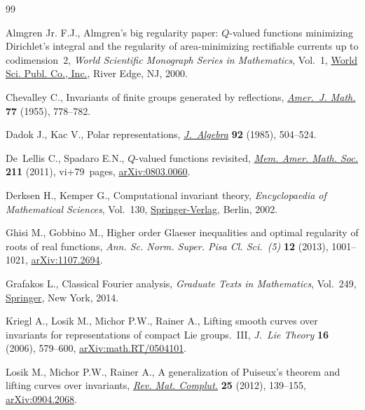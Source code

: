 \documentclass[pdftex]{sigma}
\numberwithin{equation}{section}
\begin{document}
\begin{thebibliography}{99}
\footnotesize\itemsep=0pt

Almgren Jr. F.J., Almgren's big regularity paper: $Q$-valued functions
 minimizing Dirichlet's integral and the regularity of area-minimizing
 rectifiable currents up to codimension~2, \textit{World Scientific Monograph
 Series in Mathematics}, Vol.~1, \href{https://doi.org/10.1142/4253}{World Sci. Publ. Co., Inc.}, River Edge, NJ,
 2000.

Chevalley C., Invariants of finite groups generated by reflections,
 \href{https://doi.org/10.2307/2372597}{\textit{Amer.~J. Math.}} \textbf{77} (1955), 778--782.

Dadok J., Kac V., Polar representations, \href{https://doi.org/10.1016/0021-8693(85)90136-X}{\textit{J.~Algebra}} \textbf{92}
 (1985), 504--524.

De~Lellis C., Spadaro E.N., {$Q$}-valued functions revisited, \href{https://doi.org/10.1090/S0065-9266-10-00607-1}{\textit{Mem.
 Amer. Math. Soc.}} \textbf{211} (2011), vi+79~pages, \href{https://arxiv.org/abs/0803.0060}{arXiv:0803.0060}.

Derksen H., Kemper G., Computational invariant theory, \textit{Encyclopaedia of
 Mathematical Sciences}, Vol.~130, \href{https://doi.org/10.1007/978-3-662-04958-7}{Springer-Verlag}, Berlin, 2002.

Ghisi M., Gobbino M., Higher order {G}laeser inequalities and optimal
 regularity of roots of real functions, \textit{Ann. Sc. Norm. Super. Pisa Cl.
 Sci.~(5)} \textbf{12} (2013), 1001--1021, \href{https://arxiv.org/abs/1107.2694}{arXiv:1107.2694}.

Grafakos L., Classical {F}ourier analysis, \textit{Graduate Texts in
 Mathematics}, Vol.~249, \href{https://doi.org/10.1007/978-1-4939-1194-3}{Springer}, New York, 2014.

Kriegl A., Losik M., Michor P.W., Rainer A., Lifting smooth curves over
 invariants for representations of compact {L}ie groups.~{III}, \textit{J.~Lie
 Theory} \textbf{16} (2006), 579--600, \href{https://arxiv.org/abs/math.RT/0504101}{arXiv:math.RT/0504101}.

Losik M., Michor P.W., Rainer A., A generalization of {P}uiseux's theorem and
 lifting curves over invariants, \href{https://doi.org/10.1007/s13163-011-0062-y}{\textit{Rev. Mat. Complut.}} \textbf{25}
 (2012), 139--155, \href{https://arxiv.org/abs/0904.2068}{arXiv:0904.2068}.


\end{thebibliography}
\end{document}
